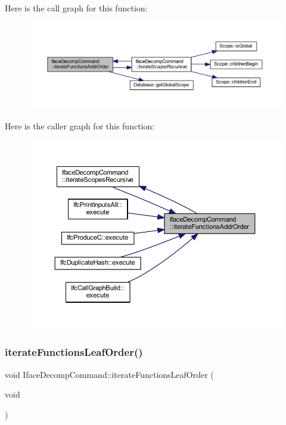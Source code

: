 Here is the call graph for this function\+:
\nopagebreak
\begin{figure}[H]
\begin{center}
\leavevmode
\includegraphics[width=350pt]{class_iface_decomp_command_a070c2e1f98082c991af6cb5a727fbd6e_cgraph}
\end{center}
\end{figure}
Here is the caller graph for this function\+:
\nopagebreak
\begin{figure}[H]
\begin{center}
\leavevmode
\includegraphics[width=350pt]{class_iface_decomp_command_a070c2e1f98082c991af6cb5a727fbd6e_icgraph}
\end{center}
\end{figure}
\mbox{\label{class_iface_decomp_command_a9ad8fa5ad85876f4a085822fa9f04d48}} 
\subsubsection{\texorpdfstring{iterateFunctionsLeafOrder()}{iterateFunctionsLeafOrder()}}
{\footnotesize\ttfamily void Iface\+Decomp\+Command\+::iterate\+Functions\+Leaf\+Order (\begin{DoxyParamCaption}\item[{void}]{ }\end{DoxyParamCaption})}



